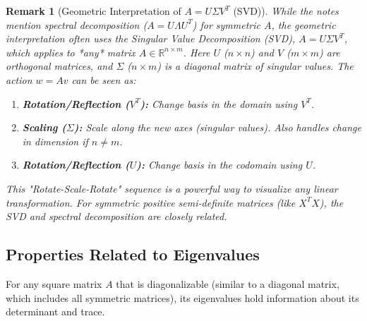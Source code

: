 \documentclass[11pt, a4paper]{article}
\theoremstyle{mydefinitionstyle}
\newtheorem{remark}{Remark}[section]
\theoremstyle{mytheoremstyle}
\newcommand{\R}{\mathbb{R}}
\begin{document}
\begin{remark}[Geometric Interpretation of $A = U \Sigma V^T$ (SVD)] \label{rem:svd_geom}
    While the notes mention spectral decomposition ($A=U\Lambda U^T$) for symmetric $A$, the geometric interpretation often uses the Singular Value Decomposition (SVD), $A = U \Sigma V^T$, which applies to *any* matrix $A \in \R^{n \times m}$. Here $U$ ($n \times n$) and $V$ ($m \times m$) are orthogonal matrices, and $\Sigma$ ($n \times m$) is a diagonal matrix of singular values. The action $w = Av$ can be seen as:
    \begin{enumerate}
        \item \textbf{Rotation/Reflection ($V^T$):} Change basis in the domain using $V^T$.
        \item \textbf{Scaling ($\Sigma$):} Scale along the new axes (singular values). Also handles change in dimension if $n \neq m$.
        \item \textbf{Rotation/Reflection ($U$):} Change basis in the codomain using $U$.
    \end{enumerate}
    This "Rotate-Scale-Rotate" sequence is a powerful way to visualize any linear transformation. For symmetric positive semi-definite matrices (like $X^TX$), the SVD and spectral decomposition are closely related.
\end{remark}

\subsection{Properties Related to Eigenvalues}

For any square matrix $A$ that is diagonalizable (similar to a diagonal matrix, which includes all symmetric matrices), its eigenvalues hold information about its determinant and trace.
\end{document}
